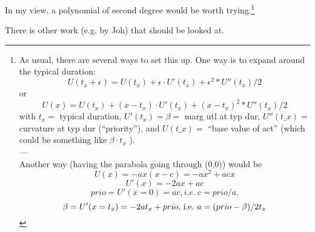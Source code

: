 In  my view, a polynomial of second degree would be worth trying.\footnote{%
%
As  usual,  there are several ways to set this up. One way is to  expand around the  typical duration:
\[
U(t_x + \epsilon) = U(t_x) + \epsilon \cdot U'(t_x) + \epsilon^2 * U''(t_x)/2
\]
or
\[
U(x) = U(t_x) + (x-t_x) \cdot U'(t_x) + (x-t_x)^2 * U''(t_x)/2
\]
with $t_x =$ typical duration, $U'(t_x) = \beta =$ marg utl at typ dur, $U''(t\_x) =$  curvature at typ dur (``priority''), and $U(t\_x) =$ ``base value of act'' (which could be something like $\beta \cdot t_x$ ).
\\
---
\\
Another way (having the parabola going through (0,0)) would be
\[
U(x) = - a x ( x - c ) = - a x^2 + a c x
\]
\[
U'(x) = - 2 a x + a c
\]
\[
prio = U'(x=0) = a c , i.e.\ c = prio/a .
\]
\[
\beta = U'(x=t_x) = - 2 a t_x + prio \hbox{, i.e.\ } a = (prio - \beta)/2t_x
\]
}

There is other work (e.g. by Joh) that should be looked at.

